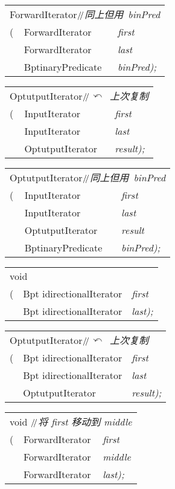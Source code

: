 \documentclass[c5size,landscape,twoside,a4paper]{ctexart}
\makeatletter
\newif\ifafour
\newif\ifletter
\let\ifafour\iftrue
\let\ifletter\iffalse
\newcommand{\<}{\ensuremath{\langle}}
\renewcommand{\>}{\ensuremath{\rangle}}
\newcommand{\BidirectionalIterator}{{{\bbfont B}\hs
            \concfont idirectionalIterator}}
\newcommand{\BinaryPredicate}{{{\bbfont B}\hs\concfont inaryPredicate}}
\newcommand{\ForwardIterator}{{\bbfont F}{\concfont orwardIterator}}
\newcommand{\InputIterator}{{\bbfont I}{\concfont nputIterator}}
\newcommand{\OutputIterator}{{\bbfont O}{\hs}{\concfont utputIterator}}
\newcommand{\hs}[1][1]{\hskip #1pt}
\newcommand{\slsl}{\ensuremath{/\kern-.2em/}} %
\newcommand{\textComm}[1]{\textsl{\textsf{#1}}}
\newcommand{\Cppslsl}{\enskip\slsl\enskip}
\newcommand{\CppComm}[1]{\Cppslsl\textComm{#1}}
\newcommand{\ret}{\ensuremath{\curvearrowleft}}
\newcommand{\asbutusing}{同上但用}
\newcommand{\commcr}{{\normalfont{,}} \\}
\newcommand{\doColorNamed}[2]{\color[named]{#1}{#2}}
\newcommand{\doColorNamed}[2]{#2}
\newcommand{\StrongClrBf}[1]{{\small\doColorNamed{Red}\textbf{#1}}}
\newenvironment{funcdec}
 { %
   \ifletter
     \setlength{\extrarowheight}{-2pt}
   \else
     \setlength{\extrarowheight}{-4pt}
   \fi
        \setlength{\tabcolsep}{0pt}
   \begin{tabular}{ll @{\quad}>{\slshape}l}}
 {\end{tabular}}
\newcommand{\lp}{(}
\newcommand{\rp}{)}
\newcommand{\parVal}[2]{{\slshape#1}{\textnormal#2}}
\newcommand{\lastPar}[1]{\parVal{#1}{\rp;}}
\makeatother
\begin{document}
\begin{multicols}{4}
\begin{funcdec}
\multicolumn{3}{l}{\ForwardIterator \CppComm{\asbutusing\ \textsl{binPred}}}\\
\StrongClrBf{unique}\lp& \ForwardIterator & first\commcr
                       & \ForwardIterator & last\commcr
                       & \BinaryPredicate & \lastPar{binPred}
\end{funcdec}


\begin{funcdec}
\multicolumn{3}{l}{\OutputIterator \CppComm{\ret\ 上次复制}}\\
\StrongClrBf{unique_copy}\lp& \InputIterator  & first\commcr
                            & \InputIterator  & last\commcr
                            & \OutputIterator & \lastPar{result}
\end{funcdec}


\begin{funcdec}
\multicolumn{3}{l}{\OutputIterator \CppComm{\asbutusing\ \textsl{binPred}}}\\
\StrongClrBf{unique_copy}\lp& \InputIterator   & first\commcr
                            & \InputIterator   & last\commcr
                            & \OutputIterator  & result\commcr
                            & \BinaryPredicate & \lastPar{binPred}
\end{funcdec}


\begin{funcdec}
\multicolumn{3}{l}{void}\\
\StrongClrBf{reverse}\lp& \BidirectionalIterator  & first\commcr
                        & \BidirectionalIterator  & \lastPar{last}
\end{funcdec}


\begin{funcdec}
\multicolumn{3}{l}{\OutputIterator \CppComm{\ret\ 上次复制}}\\
\StrongClrBf{reverse_copy}\lp& \BidirectionalIterator  & first\commcr
                             & \BidirectionalIterator  & last\commcr
                             & \OutputIterator         & \lastPar{result}
\end{funcdec}


\begin{funcdec}
\multicolumn{3}{l}{void 
                   \CppComm{将 \textsl{first} 移动到 \textsl{middle}}}\\
\StrongClrBf{rotate}\lp& \ForwardIterator  & first\commcr
                       & \ForwardIterator  & middle\commcr
                       & \ForwardIterator  & \lastPar{last}
\end{funcdec}



\end{multicols}
\end{document}
